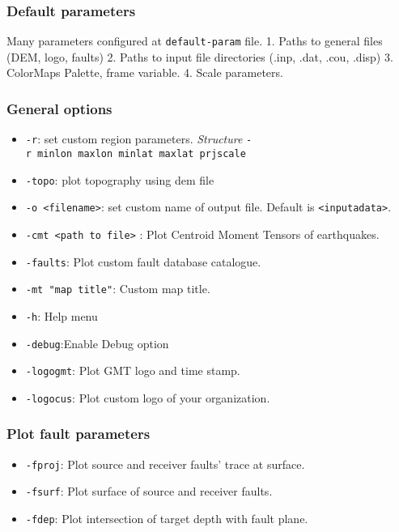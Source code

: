 \subsubsection{Default parameters}\label{default-parameters}

Many parameters configured at \texttt{default-param} file. 1. Paths to
general files (DEM, logo, faults) 2. Paths to input file directories
(.inp, .dat, .cou, .disp) 3. ColorMaps Palette, frame variable. 4. Scale
parameters.

\subsubsection{General options}\label{general-options}

\begin{itemize}
\item
  \texttt{-r}: set custom region parameters. \emph{Structure}
  \texttt{-r\ minlon\ maxlon\ minlat\ maxlat\ prjscale}
\item
  \texttt{-topo}: plot topography using dem file
\item
  \texttt{-o\ \textless{}filename\textgreater{}}: set custom name of
  output file. Default is \texttt{\textless{}inputadata\textgreater{}}.
\item
  \texttt{-cmt\ \textless{}path\ to\ file\textgreater{}} : Plot Centroid
  Moment Tensors of earthquakes.
\item
  \texttt{-faults}: Plot custom fault database catalogue.
\item
  \texttt{-mt\ "map\ title"}: Custom map title.
\item
  \texttt{-h}: Help menu
\item
  \texttt{-debug}:Enable Debug option
\item
  \texttt{-logogmt}: Plot GMT logo and time stamp.
\item
  \texttt{-logocus}: Plot custom logo of your organization.
\end{itemize}

\subsubsection{Plot fault parameters}\label{plot-fault-parameters}

\begin{itemize}
\item
  \texttt{-fproj}: Plot source and receiver faults' trace at surface.
\item
  \texttt{-fsurf}: Plot surface of source and receiver faults.
\item
  \texttt{-fdep}: Plot intersection of target depth with fault plane.
\end{itemize}

